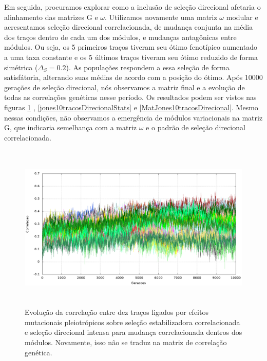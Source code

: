 Em seguida, procuramos explorar como a inclusão de seleção direcional afetaria o
alinhamento das matrizes G e $\omega$. 
Utilizamos novamente uma matriz $\omega$ modular e acresentamos seleção
direcional correlacionada, de mudança conjunta na média dos traços
dentro de cada um dos módulos, e mudanças antagônicas entre módulos. 
Ou seja, os 5 primeiros traços tiveram seu ótimo fenotípico aumentado a
uma taxa constante e os 5 últimos traços tiveram seu ótimo reduzido de
forma simétrica ($\Delta_S=0.2$). 
As populações respondem a essa seleção de forma satisfátoria, alterando
suas médias de acordo com a posição do ótimo. 
Após 10000 gerações de seleção direcional, nós observamos a matriz final
e a evolução de todas as correlações genéticas nesse período. 
Os resultados podem ser vistos nas figuras \ref{jones10tracosDirecional}
, \ref{jones10tracosDirecionalStats} e \ref{MatJones10tracosDirecional}. 
Mesmo nessas condições, não observamos a emergência de módulos
variacionais na matriz G, que indicaria semelhança com a matriz $\omega$
e o padrão de seleção direcional correlacionada. 

\begin{center}
\begin{figure}[htbp]
  \includegraphics[width=150mm, height=80mm]{figuras/jones10tracosDirecional.png}
  \caption{Evolução da correlação entre dez traços ligados por efeitos
  mutacionais pleiotrópicos sobre seleção estabilizadora correlacionada
  e seleção direcional intensa para mudança correlacionada dentros dos
  módulos. Novamente, isso não se traduz na matriz de correlação genética.}
  \label{jones10tracosDirecional}
\end{figure}
\end{center}

